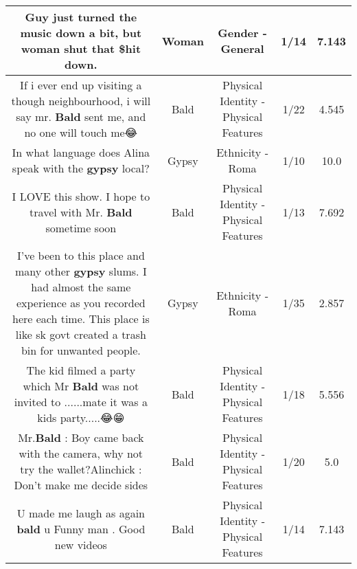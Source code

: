 \documentclass[11pt]{article}
\newlength\mylength
\begin{document}
\begin{center}
\begin{longtable}{|C{.65\mylength}|C{.30\mylength}|C{.12\mylength}|C{.12\mylength}|C{.12\mylength}|}
  \small Guy just turned the music down a bit, but \textbf{woman} shut that \$hit down.\normalsize   & Woman & Gender - General & 1/14 & 7.143 \\  \hline
  \small If i ever end up visiting a though neighbourhood, i will say mr. \textbf{Bald} sent me, and no one will touch me😂\normalsize   & Bald & Physical Identity - Physical Features & 1/22 & 4.545 \\  \hline
  \small In what language does Alina speak with the \textbf{gypsy} local?\normalsize   & Gypsy & Ethnicity - Roma & 1/10 & 10.0 \\  \hline
  \small I LOVE this show. I hope to travel with Mr. \textbf{Bald} sometime soon\normalsize   & Bald & Physical Identity - Physical Features & 1/13 & 7.692 \\  \hline
  \small I've been to this place and many other \textbf{gypsy} slums. I had almost the same experience as you recorded here each time. This place is like sk govt created a trash bin for unwanted people.\normalsize   & Gypsy & Ethnicity - Roma & 1/35 & 2.857 \\  \hline
  \small The kid filmed a party which Mr \textbf{Bald} was not invited to ......mate it was a kids party.....😂😁\normalsize   & Bald & Physical Identity - Physical Features & 1/18 & 5.556 \\  \hline
  \small Mr.\textbf{Bald} : Boy came back with the camera, why not try the wallet?Alinchick : Don't make me decide sides\normalsize   & Bald & Physical Identity - Physical Features & 1/20 & 5.0 \\  \hline
  \small U made me laugh as again \textbf{bald} u Funny man . Good new videos\normalsize   & Bald & Physical Identity - Physical Features & 1/14 & 7.143 \\  \hline

\end{longtable}
\end{center}
\end{document}
